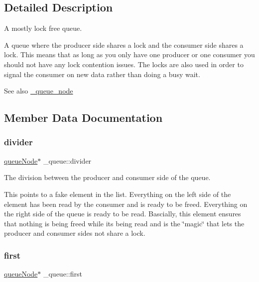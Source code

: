 \subsection{Detailed Description}
A mostly lock free queue. 

A queue where the producer side shares a lock and the consumer side shares a lock. This means that as long as you only have one producer or one consumer you should not have any lock contention issues. The locks are also used in order to signal the consumer on new data rather than doing a busy wait.

\begin{DoxySeeAlso}{See also}
\hyperlink{struct__queue__node}{\+\_\+queue\+\_\+node} 
\end{DoxySeeAlso}


\subsection{Member Data Documentation}
\mbox{\label{struct__queue_a4def97dd0c360cb833228b57dada20dc}} 
\subsubsection{\texorpdfstring{divider}{divider}}
{\footnotesize\ttfamily \hyperlink{queue_8h_ae1857eedcea35e26ec2c78b7b122b095}{queue\+Node}$\ast$ \+\_\+queue\+::divider}



The division between the producer and consumer side of the queue. 

This points to a fake element in the list. Everything on the left side of the element has been read by the consumer and is ready to be freed. Everything on the right side of the queue is ready to be read. Bascially, this element ensures that nothing is being free\textquotesingle{}d while it\textquotesingle{}s being read and is the \char`\"{}magic\char`\"{} that lets the producer and consumer sides not share a lock. \mbox{\label{struct__queue_a3720f64e698aa40d96ee20e8751c41fb}} 
\subsubsection{\texorpdfstring{first}{first}}
{\footnotesize\ttfamily \hyperlink{queue_8h_ae1857eedcea35e26ec2c78b7b122b095}{queue\+Node}$\ast$ \+\_\+queue\+::first}



